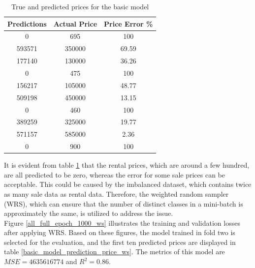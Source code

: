 \documentclass[12pt,twoside]{report}
\begin{document}
\begin{table}[!htbp]
	\centering
	\caption{ True and predicted prices for the basic model}
	\label{basic_model_prediction_price}
	\begin{tabular}{| c | c | c |}
		\hline
		Predictions & Actual Price & Price Error \% \\
		\hline
		0 & 695 & 100 \\
		\hline
		593571 & 350000 & 69.59 \\
		\hline
		177140 & 130000 & 36.26 \\
		\hline
		0 & 475 & 100 \\
		\hline
		156217 & 105000 & 48.77 \\
		\hline
		509198 & 450000 & 13.15 \\
		\hline
		0 & 460 & 100 \\ 
		\hline
		389259 & 325000 & 19.77 \\
		\hline
		571157 & 585000 & 2.36 \\
		\hline
		0 & 900 & 100 \\
		\hline
	\end{tabular}
\end{table}

 It is evident from table \ref{basic_model_prediction_price} that the rental prices, which are around a few hundred, are all predicted to be zero, whereas the error for some sale prices can be acceptable. This could be caused by the imbalanced dataset, which contains twice as many sale data as rental data. Therefore, the weighted random sampler (WRS), which can ensure that the number of distinct classes in a mini-batch is approximately the same, is utilized to address the issue.
 \\
 
Figure \ref{all_full_epoch_1000_ws} illustrates the training and validation losses after applying WRS. Based on these figures, the model trained in fold two is selected for the evaluation, and the first ten predicted prices are displayed in table \ref{basic_model_prediction_price_ws}. The metrics of this model are $MSE = 4635616774$ and $R^2 = 0.86$. 
\end{document}
